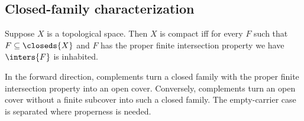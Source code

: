 \subsection{Closed-family characterization}

\begin{theorem}\label{compact_iff_closed_proper_finite_intersection_property}
    Suppose $X$ is a topological space.
    Then $X$ is compact iff for every $F$ such that
        $F\subseteq\closeds{X}$ and $F$ has the proper finite intersection property
        we have $\inters{F}$ is inhabited.
\end{theorem}

In the forward direction, complements turn a closed family with the
proper finite intersection property into an open cover. Conversely,
complements turn an open cover without a finite subcover into such a
closed family. The empty-carrier case is separated where properness is
needed.

